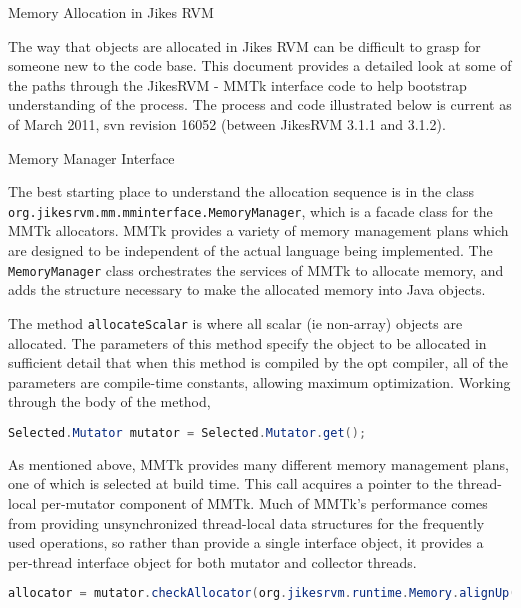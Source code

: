 \begin{section}{Memory Allocation in Jikes RVM}
\label{sec:memoryallocationinjikesrvm}

The way that objects are allocated in Jikes RVM can be difficult to grasp for someone new to the code base.  This document provides a detailed look at some of the paths through the JikesRVM - MMTk interface code to help bootstrap understanding of the process.  The process and code illustrated below is current as of March 2011, svn revision 16052 (between JikesRVM 3.1.1 and 3.1.2).

\begin{subsection}{Memory Manager Interface}

The best starting place to understand the allocation sequence is in the class \texttt{org.jikes\-rvm.mm.mm\-in\-ter\-fa\-ce.Me\-mo\-ry\-Ma\-na\-ger}, which is a facade class for the MMTk allocators.  MMTk provides a variety of memory management plans which are designed to be independent of the actual language being implemented.  The \texttt{MemoryManager} class orchestrates the services of MMTk to allocate memory, and adds the structure necessary to make the allocated memory into Java objects.

The method \texttt{allocateScalar} is where all scalar (ie non-array) objects are allocated.  The parameters of this method specify the object to be allocated in sufficient detail that when this method is compiled by the opt compiler, all of the parameters are compile-time constants, allowing maximum optimization.  Working through the body of the method,

\begin{lstlisting}[language=Java]
Selected.Mutator mutator = Selected.Mutator.get();
\end{lstlisting}

As mentioned above, MMTk provides many different memory management plans, one of which is selected at build time.  This call acquires a pointer to the thread-local per-mutator component of MMTk.  Much of MMTk's performance comes from providing unsynchronized thread-local data structures for the frequently used operations, so rather than provide a single interface object, it provides a per-thread interface object for both mutator and collector threads.

\begin{lstlisting}[language=Java]
allocator = mutator.checkAllocator(org.jikesrvm.runtime.Memory.alignUp(size, MIN_ALIGNMENT), align, allocator);
\end{lstlisting}


\end{subsection}
\end{section}
